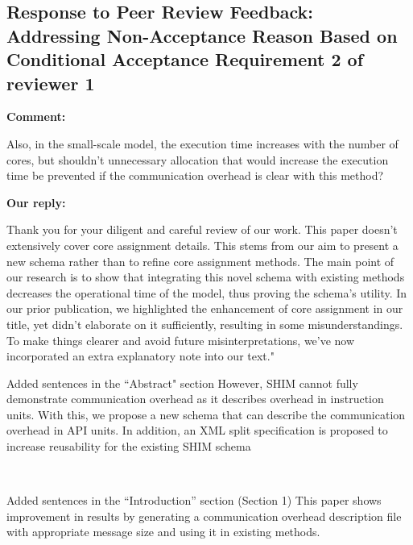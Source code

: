 \documentclass{article}
\begin{document}
\newpage
\begin{flushleft}
\subsection{Response to Peer Review Feedback: Addressing Non-Acceptance Reason Based on Conditional Acceptance Requirement 2 of reviewer 1}
    \textbf{Comment:}
    \bigskip
    \begin{adjustwidth}{1cm}{1cm}  %
    Also, in the small-scale model, the execution time increases with the number of cores, but shouldn't unnecessary allocation that would increase the execution time be prevented if the communication overhead is clear with this method?
    \end{adjustwidth}
  \end{flushleft}

  \begin{flushleft}
    \textbf{Our reply:}
\end{flushleft}

\begin{adjustwidth}{1cm}{1cm}  %
 Thank you for your diligent and careful review of our work. This paper doesn't extensively cover core assignment details. This stems from our aim to present a new schema rather than to refine core assignment methods. The main point of our research is to show that integrating this novel schema with existing methods decreases the operational time of the model, thus proving the schema's utility. In our prior publication, we highlighted the enhancement of core assignment in our title, yet didn't elaborate on it sufficiently, resulting in some misunderstandings. To make things clearer and avoid future misinterpretations, we've now incorporated an extra explanatory note into our text."
\end{adjustwidth}
\bigskip
\begin{itembox}[|]{Added sentences in the ``Abstract" section}
However, SHIM cannot fully demonstrate communication overhead as it describes overhead in instruction units. With this, we propose a new schema that can describe the communication overhead in API units. In addition, an XML split specification is proposed to increase reusability for the existing SHIM schema
\end{itembox}\\

\begin{itembox}[|]{Added sentences in the “Introduction” section (Section 1)}
This paper shows improvement in results by generating a communication overhead description file with appropriate message size and using it in existing methods.
\end{itembox}\\
\end{document}
